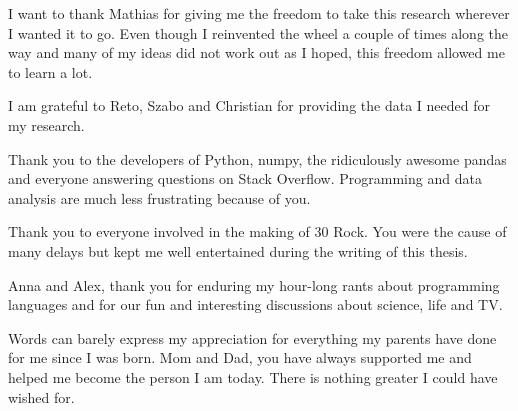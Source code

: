I want to thank Mathias for giving me the freedom to take this research
wherever I wanted it to go. Even though I reinvented the wheel a couple of
times along the way and many of my ideas did not work out as I hoped, this
freedom allowed me to learn a lot.

I am grateful to Reto, Szabo and Christian for providing the data I needed for
my research.

Thank you to the developers of Python, numpy, the ridiculously awesome pandas
and everyone answering questions on Stack Overflow. Programming and data
analysis are much less frustrating because of you.

Thank you to everyone involved in the making of 30 Rock. You were the cause of
many delays but kept me well entertained during the writing of this thesis.

Anna and Alex, thank you for enduring my hour-long rants about programming
languages and for our fun and interesting discussions about science, life and
TV.

Words can barely express my appreciation for everything my parents have done
for me since I was born. Mom and Dad, you have always supported me and helped
me become the person I am today. There is nothing greater I could have wished
for.

